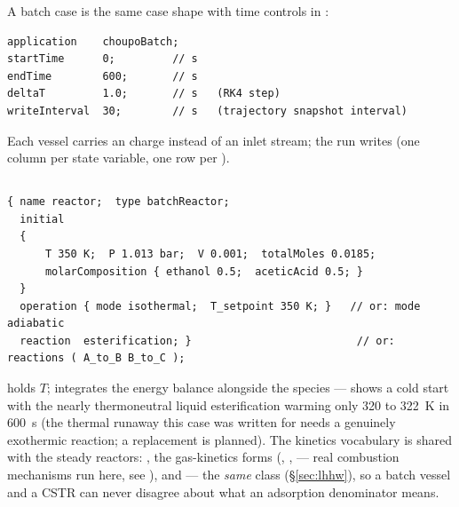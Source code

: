 \documentclass[11pt,a4paper]{article}
\begin{document}
A batch case is the same case shape with time controls in
:

\begin{lstlisting}[language=dict]
application    choupoBatch;
startTime      0;         // s
endTime        600;       // s
deltaT         1.0;       // s   (RK4 step)
writeInterval  30;        // s   (trajectory snapshot interval)
\end{lstlisting}

Each vessel carries an  charge instead of an inlet
stream; the run writes  (one column per state
variable, one row per ).

\subsection{}

\begin{lstlisting}[language=dict]
{ name reactor;  type batchReactor;
  initial
  {
      T 350 K;  P 1.013 bar;  V 0.001;  totalMoles 0.0185;
      molarComposition { ethanol 0.5;  aceticAcid 0.5; }
  }
  operation { mode isothermal;  T_setpoint 350 K; }   // or: mode adiabatic
  reaction  esterification; }                          // or: reactions ( A_to_B B_to_C );
\end{lstlisting}

 holds $T$;  integrates the
energy balance alongside the species ---  shows
a cold start with the nearly thermoneutral liquid esterification warming
only 320 to 322~K in 600~s (the thermal runaway this case was written
for needs a genuinely exothermic reaction; a replacement is planned).  The kinetics vocabulary is shared with the
steady reactors: , the gas-kinetics forms
(, ,  --- real
combustion mechanisms run here, see ),
and  --- the \emph{same}  class
(\S\ref{sec:lhhw}), so a batch vessel and a CSTR can never disagree
about what an adsorption denominator means.
\end{document}
